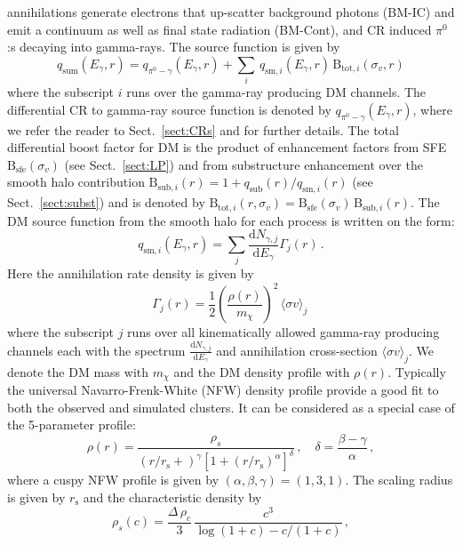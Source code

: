 \documentclass[10pt,aps,pra,reprint,amsmath,amsfonts,amssymb,showpacs]{revtex4-1}
\newcommand{\rmn}{\mathrm}
\newcommand{\sfe}{\rmn{sfe}}
\newcommand{\sub}{\rmn{sub}}
\newcommand{\s}{\rmn{s}}
\newcommand{\dd}{\rmn{d}}
\newcommand{\mx}{\ensuremath{m_{\chi}}}
\newcommand{\ngammaj}{\ensuremath{N_{\gamma,j}}}
\newcommand{\sigmaannv}{\ensuremath{\langle\sigma v\rangle}}
\newcommand{\sigv}{\ensuremath{\sigma_v}}
\newcommand{\egamma}{\ensuremath{E_{\gamma}}}
\newcommand{\rhos}{\ensuremath{\rho_s}}
\newcommand{\rhoc}{\ensuremath{\rho_c}}
\newcommand{\B}{\rmn{B}}
\newcommand{\eg}{E_\gamma}
\begin{document}
annihilations generate electrons that up-scatter background photons
(BM-IC) and emit a continuum as well as final state radiation
(BM-Cont), and CR induced $\pi^0$:s decaying into gamma-rays. The
source function is given by
\begin{equation}
q_\rmn{sum} (\eg,r) = q_{\pi^0-\gamma}(\eg,r)+
\sum_i \,q_{\rmn{sm},i}(\eg,r)\,\B_{\rmn{tot},i}(\sigv,r)
\end{equation}
where the subscript $i$ runs over the gamma-ray producing DM
channels. The differential CR to gamma-ray source function is denoted
by $q_{\pi^0-\gamma}(\eg,r)$, where we refer the reader to
Sect.~\ref{sect:CRs} and \cite{2010MNRAS.409..449P} for further
details. The total differential boost factor for DM is the product of
enhancement factors from SFE $\B_\sfe(\sigv)$ (see
Sect.~\ref{sect:LP}) and from substructure enhancement over the smooth
halo contribution $\B_{\sub,i}(r) = 1+q_\sub(r)/q_{\rmn{sm},i}(r)$
(see Sect.~\ref{sect:subst}) and is denoted by
$\B_{\rmn{tot},i}(r,\sigv) = \B_\sfe(\sigv)\,\B_{\sub,i}(r)$. The DM
source function from the smooth halo for each process is written on
the form:
\begin{equation}
\label{eq:q_sm}
q_{\rmn{sm},i} (\egamma,r) = \sum_j
\frac{\dd \ngammaj}{\dd E_\gamma} \Gamma_j(r)\,.
\end{equation}
Here the annihilation rate density is given by 
\begin{equation}
\label{eq:ann_rate}
\Gamma_j(r) = \frac{1}{2} \left(\frac{\rho(r)}{\mx}\right)^2 
\, \sigmaannv_j\,
\end{equation}
where the subscript $j$ runs over all kinematically allowed gamma-ray
producing channels each with the spectrum $\frac{\dd
  \ngammaj}{\dd\eg}$ and annihilation cross-section $\sigmaannv_j$. We
denote the DM mass with $\mx$ and the DM density profile with
$\rho(r)$. Typically the universal Navarro-Frenk-White (NFW) density
profile provide a good fit to both the observed and simulated
clusters. It can be considered as a special case of the 5-parameter profile:
\begin{equation}
\rho(r) = \frac{\rhos}{\left(r/r_\s+\right)^\gamma
  \left[1+\left(r/r_\s\right)^\alpha\right]^\delta}\,,\quad
\delta=\frac{\beta-\gamma}{\alpha}\,,
\label{eq:rho_nfw}
\end{equation}
where a cuspy NFW profile is given by
$(\alpha,\beta,\gamma)=(1,3,1)$. The scaling radius is given by $r_\s$
and the characteristic density by 
\begin{equation}
\rhos(c)=\frac{\Delta\,\rhoc}{3}\,\frac{c^3}
{\log\left(1+c\right)-c/(1+c)}\,,
\label{eq:rho_s}
\end{equation}
\end{document}
